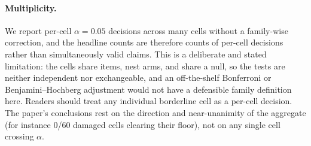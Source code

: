 \paragraph{Multiplicity.} We report per-cell $\alpha=0.05$ decisions across many cells without a family-wise correction, and the headline counts are therefore counts of per-cell decisions rather than simultaneously valid claims. This is a deliberate and stated limitation: the cells share items, nest arms, and share a null, so the tests are neither independent nor exchangeable, and an off-the-shelf Bonferroni or Benjamini--Hochberg adjustment would not have a defensible family definition here. Readers should treat any individual borderline cell as a per-cell decision. The paper's conclusions rest on the direction and near-unanimity of the aggregate (for instance 0/60 damaged cells clearing their floor), not on any single cell crossing $\alpha$.

